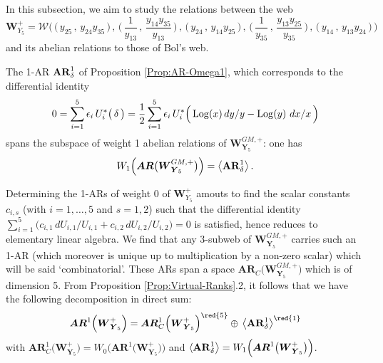 \documentclass[11pt]{amsart}
\begin{document}
In this subsection, we aim to study the relations between the web 
\begin{equation*}
\boldsymbol{W}^{+}_{ {Y}_5}
= 
\boldsymbol{\mathcal W}
\Bigg(\, \Big(\,    {y_{25}}\, , \,     {y_{24}}    {y_{35}}
\, \Big)
\, , \, 
\Big(\,    \frac{1}{y_{13}}\, , \, 
\frac{   {y_{14}}    {y_{35}}}{   {y_{13}}}\, \Big)
\, , \,
  \bigg( 
  \,    {y_{24}}
 \, , \,  
      {y_{14}}    {y_{25}}
   \, \bigg)
\, , \, 
\bigg(\,     \frac{1}{y_{35}}
\, , \, 
\frac{   {y_{13}}    {y_{25}}}{   {y_{35}}}
\,
\bigg)
\, , \, 
 \Big(\,    {y_{14}}
\, , \, 
    {y_{13}}    {y_{24}}
 \, 
\Big) \,\Bigg)
\end{equation*}
and its abelian relations to those of Bol's web. 



The 1-AR ${\bf AR}_\delta^1$ of 
Proposition \ref{Prop:AR-Omega1}, which corresponds to the 
differential 
identity 
$$
0=
\sum_{i=1}^5 \epsilon_i\, U_i^*\big(\,  
\delta \, \big)
 =\frac{1}{2}
\sum_{i=1}^5 \epsilon_i\, U_i^*\Big(\,  
{\rm Log}(x)\, {dy}/{y}-{\rm Log}(y)\,\, {dx}/{x}\, 
\Big)$$ spans the subspace of weight 1 abelian relations of $\boldsymbol{W}^{GM,+}_{ \boldsymbol{Y}_5}$: one has
$$
W_1\Big( \boldsymbol{AR}\big( \boldsymbol{W}^{GM,+}_{ \boldsymbol{Y}_5}
\big) 
\Big) =\big\langle 
{\bf AR}_\delta^1
\big\rangle \, .
$$


Determining the 1-ARs of weight 0 of $\boldsymbol{W}^{+}_{ {Y}_5}$  amouts to find the scalar constants $c_{i,s}$ (with $i=1,\ldots,5$ and $s=1,2$) such that the differential identity $
\sum_{i=1}^5 \Big(c_{i,1} \, {dU_{i,1}}/{U_{i,1}}+c_{i,2} \, {dU_{i,2}}/{U_{i,2}} \Big) =0
$ is satisfied, hence reduces to elementary linear algebra. We find that any 3-subweb of $\boldsymbol{W}^{GM,+}_{ \boldsymbol{Y}_5}$ carries such an 1-AR (which moreover is unique up to multiplication by a non-zero scalar) which will be said `combinatorial'. These ARs span a space 
$\boldsymbol{AR}_C\big( \boldsymbol{W}^{GM,+}_{ \boldsymbol{Y}_5}\big)$ which is of dimension 5. From Proposition \ref{Prop:Virtual-Ranks}{.2}, it follows that 
we have the following decomposition in direct sum: 
\begin{equation}
\label{Eq:Decomp-AR1-W+}
\boldsymbol{AR}^1\Big( \boldsymbol{W}_{\boldsymbol{Y}_5}^{+}\Big)=
{\boldsymbol{AR}^1_{C}\Big( \boldsymbol{W}_{\boldsymbol{Y}_5}^{+}\Big)^{{\red{5}}}}
\oplus \,
\big\langle 
{\bf AR}_\delta^1
\big\rangle^{{\red{1}}}
\end{equation}
with 
$\boldsymbol{AR}^1_{C}\Big( \boldsymbol{W}_{\boldsymbol{Y}_5}^{+}\Big)=
{W_0\Big( \boldsymbol{AR}^1\big(\boldsymbol{W}_{\boldsymbol{Y}_5}^{+}\big)\Big)}
$ and 
$\langle 
{\bf AR}_\delta^1
\big\rangle= W_1\Big( \boldsymbol{AR}^1\big(\boldsymbol{W}_{\boldsymbol{Y}_5}^{+}\big)\Big)$. 
\end{document}
